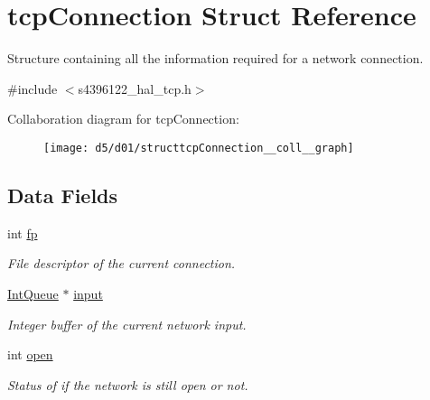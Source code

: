 \hypertarget{structtcpConnection}{}\section{tcp\+Connection Struct Reference}
\label{structtcpConnection}


Structure containing all the information required for a network connection.  




{\ttfamily \#include $<$s4396122\+\_\+hal\+\_\+tcp.\+h$>$}



Collaboration diagram for tcp\+Connection\+:\nopagebreak
\begin{figure}[H]
\begin{center}
\leavevmode
\texttt{[image: d5/d01/structtcpConnection\_\_coll\_\_graph]}
\end{center}
\end{figure}
\subsection*{Data Fields}
\begin{DoxyCompactItemize}
\item 
int \hyperlink{structtcpConnection_a7d642c6f8bda4cfa978eb8f4288ee5df}{fp}\hypertarget{structtcpConnection_a7d642c6f8bda4cfa978eb8f4288ee5df}{}\label{structtcpConnection_a7d642c6f8bda4cfa978eb8f4288ee5df}

\begin{DoxyCompactList}\small\item\em File descriptor of the current connection. \end{DoxyCompactList}\item 
\hyperlink{structIntQueue}{Int\+Queue} $\ast$ \hyperlink{structtcpConnection_aad0ac0e1dec718e9cea42852934a315e}{input}\hypertarget{structtcpConnection_aad0ac0e1dec718e9cea42852934a315e}{}\label{structtcpConnection_aad0ac0e1dec718e9cea42852934a315e}

\begin{DoxyCompactList}\small\item\em Integer buffer of the current network input. \end{DoxyCompactList}\item 
int \hyperlink{structtcpConnection_a9597618fdbb9faa5d83d54d8f2126935}{open}\hypertarget{structtcpConnection_a9597618fdbb9faa5d83d54d8f2126935}{}\label{structtcpConnection_a9597618fdbb9faa5d83d54d8f2126935}

\begin{DoxyCompactList}\small\item\em Status of if the network is still open or not. \end{DoxyCompactList}\end{DoxyCompactItemize}


